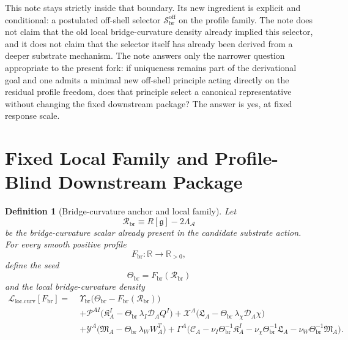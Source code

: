 \documentclass[11pt]{article}
\newcommand{\Sub}{\mathcal{A}}
\newcommand{\BridgeMetric}{\mathfrak g}
\newcommand{\SpatialD}{\mathcal D}
\newcommand{\ConstCurrent}{\mathcal C}
\newcommand{\ConstGamma}{\Gamma}
\newcommand{\CurvQMult}{\mathscr P}
\newcommand{\CurvChiMult}{\mathscr X}
\newcommand{\CurvTransMult}{\mathscr Y}
\newcommand{\CurvSeed}{\Theta_{\mathrm{br}}}
\newcommand{\CurvSeedMult}{\Upsilon_{\mathrm{br}}}
\newcommand{\CurvProfile}{F_{\mathrm{br}}}
\newcommand{\CurvOneI}{\mathfrak K}
\newcommand{\CurvOneChi}{\mathfrak L}
\newcommand{\CurvOneW}{\mathfrak M}
\newcommand{\BridgeCurv}{\mathcal R_{\mathrm{br}}}
\newcommand{\ProfRule}{\mathscr S_{\mathrm{br}}^{\mathrm{off}}}
\newtheorem{definition}{Definition}
\begin{document}
This note stays strictly inside that boundary. Its new ingredient is explicit and conditional: a postulated off-shell selector \(\ProfRule\) on the profile family. The note does not claim that the old local bridge-curvature density already implied this selector, and it does not claim that the selector itself has already been derived from a deeper substrate mechanism. The note answers only the narrower question appropriate to the present fork: if uniqueness remains part of the derivational goal and one admits a minimal new off-shell principle acting directly on the residual profile freedom, does that principle select a canonical representative without changing the fixed downstream package? The answer is yes, at fixed response scale.

\section{Fixed Local Family and Profile-Blind Downstream Package}

\begin{definition}[Bridge-curvature anchor and local family]
\label{def:family}
Let
\begin{equation}
\BridgeCurv \equiv R[\BridgeMetric]-2\Lambda_{\Sub}
\label{eq:anchor}
\end{equation}
be the bridge-curvature scalar already present in the candidate substrate action. For every smooth positive profile
\begin{equation}
\CurvProfile:\mathbb R\to\mathbb R_{>0},
\label{eq:profilepositive}
\end{equation}
define the seed
\begin{equation}
\CurvSeed=\CurvProfile(\BridgeCurv)
\label{eq:seed}
\end{equation}
and the local bridge-curvature density
\begin{align}
\mathcal L_{\mathrm{loc.curv}}[\CurvProfile]
=\;&
\CurvSeedMult\bigl(\CurvSeed-\CurvProfile(\BridgeCurv)\bigr)
\nonumber\\
&+\CurvQMult^{AI}\bigl(\CurvOneI_A^I-\CurvSeed\,\lambda_I\SpatialD_AQ^I\bigr)
+\CurvChiMult^A\bigl(\CurvOneChi_A-\CurvSeed\,\lambda_\chi\SpatialD_A\chi\bigr)
\nonumber\\
&+\CurvTransMult^A\bigl(\CurvOneW_A-\CurvSeed\,\lambda_WW_A^T\bigr)
+\ConstGamma^A\bigl(
\ConstCurrent_A
-\nu_I\CurvSeed^{-1}\CurvOneI_A^I
-\nu_\chi\CurvSeed^{-1}\CurvOneChi_A
-\nu_W\CurvSeed^{-1}\CurvOneW_A
\bigr).
\label{eq:locfamily}
\end{align}
\end{definition}
\end{document}
